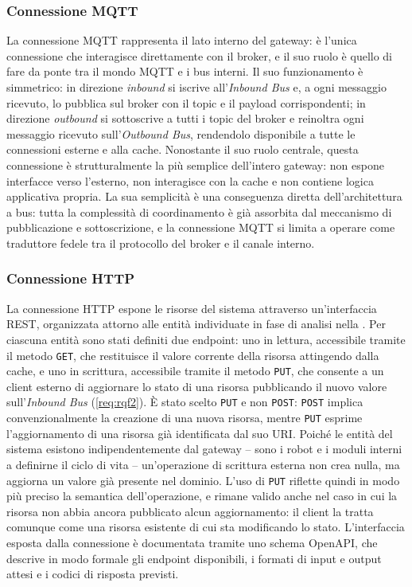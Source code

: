 \subsubsection{Connessione \ac{MQTT}}
\label{subsubsec:connessione-mqtt}
%
La connessione \ac{MQTT} rappresenta il lato interno del gateway: è l'unica connessione che interagisce direttamente con il broker, e il suo ruolo è quello di fare da ponte tra il mondo \ac{MQTT} e i bus interni. Il suo funzionamento è simmetrico: in direzione \textit{inbound} si iscrive all'\textit{Inbound Bus} e, a ogni messaggio ricevuto, lo pubblica sul broker con il topic e il payload corrispondenti; in direzione \textit{outbound} si sottoscrive a tutti i topic del broker e reinoltra ogni messaggio ricevuto sull'\textit{Outbound Bus}, rendendolo disponibile a tutte le connessioni esterne e alla cache.
Nonostante il suo ruolo centrale, questa connessione è strutturalmente la più semplice dell'intero gateway: non espone interfacce verso l'esterno, non interagisce con la cache e non contiene logica applicativa propria. La sua semplicità è una conseguenza diretta dell'architettura a bus: tutta la complessità di coordinamento è già assorbita dal meccanismo di pubblicazione e sottoscrizione, e la connessione \ac{MQTT} si limita a operare come traduttore fedele tra il protocollo del broker e il canale interno.
%
\subsubsection{Connessione \ac{HTTP}}
\label{subsubsec:connessione-http}
%
La connessione \ac{HTTP} espone le risorse del sistema attraverso un'interfaccia \ac{REST}, organizzata attorno alle entità individuate in fase di analisi nella . Per ciascuna entità sono stati definiti due endpoint: uno in lettura, accessibile tramite il metodo \texttt{GET}, che restituisce il valore corrente della risorsa attingendo dalla cache, e uno in scrittura, accessibile tramite il metodo \texttt{PUT}, che consente a un client esterno di aggiornare lo stato di una risorsa pubblicando il nuovo valore sull'\textit{Inbound Bus} (\ref{req:rqf2}). È stato scelto \texttt{PUT} e non \texttt{POST}: \texttt{POST} implica convenzionalmente la creazione di una nuova risorsa, mentre \texttt{PUT} esprime l'aggiornamento di una risorsa già identificata dal suo \ac{URI}. Poiché le entità del sistema esistono indipendentemente dal gateway -- sono i robot e i moduli interni a definirne il ciclo di vita -- un'operazione di scrittura esterna non crea nulla, ma aggiorna un valore già presente nel dominio. L'uso di \texttt{PUT} riflette quindi in modo più preciso la semantica dell'operazione, e rimane valido anche nel caso in cui la risorsa non abbia ancora pubblicato alcun aggiornamento: il client la tratta comunque come una risorsa esistente di cui sta modificando lo stato. L'interfaccia esposta dalla connessione è documentata tramite uno schema \ac{OpenAPI}, che descrive in modo formale gli endpoint disponibili, i formati di input e output attesi e i codici di risposta previsti.
%
